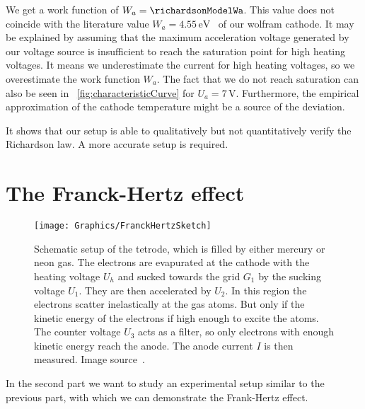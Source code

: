 \documentclass[a4paper,10pt,twocolumn]{article}
\newcommand{\wolframWa}{4.55\, \mathrm{eV}}
\newcommand{\volt}{\, \mathrm{V}}
\newcommand{\sevenV}{7 \volt}
\begin{document}
    We get a work function of $W_a = \richardsonModelWa$.
    This value does not coincide with the literature value $W_a = \wolframWa$~\cite{wolfram} of our wolfram cathode.
    It may be explained by assuming that the maximum acceleration voltage generated by our voltage source is
    insufficient to reach the saturation point for high heating voltages.
    It means we underestimate the current for high heating voltages, so we overestimate the work function $W_a$.
    The fact that we do not reach saturation can also be seen in ~\autoref{fig:characteristicCurve} for $U_a = \sevenV$.
    Furthermore, the empirical approximation of the cathode temperature might be a source of the deviation.
    
    It shows that our setup is able to qualitatively but not quantitatively verify the Richardson law.
    A more accurate setup is required.
    
    \section{The Franck-Hertz effect}

    \begin{figure}[htbp]
        \texttt{[image: Graphics/FranckHertzSketch]}
        \center
        \caption{Schematic setup of the tetrode, which is filled by either mercury or neon gas.
        The electrons are evapurated at the cathode with the heating voltage $U_h$ and sucked towards
        the grid $G_1$ by the sucking voltage $U_1$.
        They are then accelerated by $U_2$.
        In this region the electrons scatter inelastically at the gas atoms. 
        But only if the kinetic energy of the electrons if high enough to excite the atoms.
        The counter voltage $U_3$ acts as a filter, so only electrons with enough kinetic energy reach
        the anode.
        The anode current $I$ is then measured.
        Image source~\cite{frankHertzSource}.
        }
        \label{fig:franckHertzSketch}
    \end{figure}
    
    In the second part we want to study an experimental setup similar to the previous part,
    with which we can demonstrate the Frank-Hertz effect.
    
\end{document}
